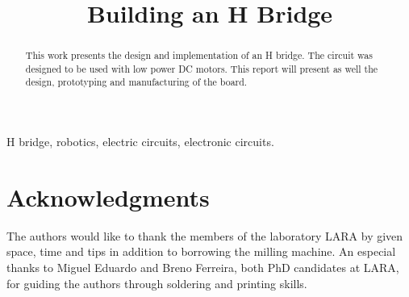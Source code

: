 \documentclass[journal]{IEEEtran}
\begin{document}
    \title{Building an H Bridge}
    
    \author{
        }
    
    \maketitle
    
    \begin{abstract}
        
        This work presents the design and implementation of an H bridge. The circuit was designed to be used with low power DC motors. This report will present as well the design, prototyping and manufacturing of the board.
                
    \end{abstract}
    
    \begin{IEEEkeywords}
        H bridge, robotics, electric circuits, electronic circuits.        
    \end{IEEEkeywords}
    
 
    
    
    
    
    
    

    \section{Acknowledgments} %
    \label{sec:acknowledgments}
        The authors would like to thank the members of the laboratory LARA by given space, time and tips in addition to borrowing the milling machine. An especial thanks to Miguel Eduardo and Breno Ferreira, both PhD candidates at LARA, for guiding the authors through soldering and printing skills.
    
    
    
    
    
    
\end{document}
